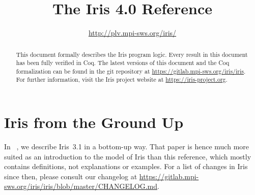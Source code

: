 \documentclass[10pt]{article}
\title{\bfseries The Iris 4.0 Reference}
\author{\url{http://plv.mpi-sws.org/iris/}}
\begin{document}
\maketitle
\thispagestyle{empty}
\vfill
\begin{abstract}
This document formally describes the Iris program logic.
Every result in this document has been fully verified in Coq.
The latest versions of this document and the Coq formalization can be found in the git repository at \url{https://gitlab.mpi-sws.org/iris/iris}.
For further information, visit the Iris project website at \url{https://iris-project.org}.
\end{abstract}

\clearpage\begingroup
\tableofcontents
\endgroup

\clearpage\begingroup
\section{Iris from the Ground Up}
In ~\cite{iris-ground-up}, we describe Iris~3.1 in a bottom-up way.
That paper is hence much more suited as an introduction to the model of Iris than this reference, which mostly contains definitions, not explanations or examples.
For a list of changes in Iris since then, please consult our changelog at \url{https://gitlab.mpi-sws.org/iris/iris/blob/master/CHANGELOG.md}.
\endgroup

\clearpage\begingroup

\endgroup
\clearpage\begingroup

\endgroup
\clearpage\begingroup

\endgroup
\clearpage\begingroup

\endgroup
\clearpage\begingroup

\endgroup
\clearpage\begingroup

\endgroup
\clearpage\begingroup

\endgroup
\clearpage\begingroup

\endgroup
\clearpage\begingroup

\endgroup
\clearpage\begingroup

\endgroup
\clearpage\begingroup
\printbibliography
\endgroup
\end{document}
